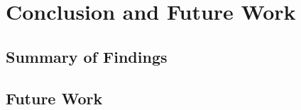 \chapter{Conclusion and Future Work}
\label{ch:conclusion}

\section{Summary of Findings}
\label{sec:conc-summary}

\section{Future Work}
\label{sec:conc-future}
